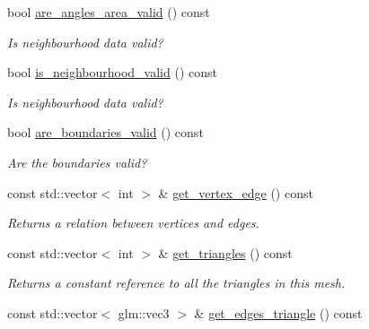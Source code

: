 \begin{DoxyCompactItemize}
\mbox{\label{classgeoproc_1_1TriangleMesh_ad25eb7051e7eac604142d45929f33c19}} 
bool \hyperlink{classgeoproc_1_1TriangleMesh_ad25eb7051e7eac604142d45929f33c19}{are\+\_\+angles\+\_\+area\+\_\+valid} () const
\begin{DoxyCompactList}\small\item\em Is neighbourhood data valid? \end{DoxyCompactList}\item 
\mbox{\label{classgeoproc_1_1TriangleMesh_aa6f95b95709a72a14a15638bfeeed3f9}} 
bool \hyperlink{classgeoproc_1_1TriangleMesh_aa6f95b95709a72a14a15638bfeeed3f9}{is\+\_\+neighbourhood\+\_\+valid} () const
\begin{DoxyCompactList}\small\item\em Is neighbourhood data valid? \end{DoxyCompactList}\item 
\mbox{\label{classgeoproc_1_1TriangleMesh_a409e399857e1a1abc9f23918ff5f5860}} 
bool \hyperlink{classgeoproc_1_1TriangleMesh_a409e399857e1a1abc9f23918ff5f5860}{are\+\_\+boundaries\+\_\+valid} () const
\begin{DoxyCompactList}\small\item\em Are the boundaries valid? \end{DoxyCompactList}\item 
const std\+::vector$<$ int $>$ \& \hyperlink{classgeoproc_1_1TriangleMesh_ae73a760e61250eb2f474b8ab03a1e2ab}{get\+\_\+vertex\+\_\+edge} () const
\begin{DoxyCompactList}\small\item\em Returns a relation between vertices and edges. \end{DoxyCompactList}\item 
const std\+::vector$<$ int $>$ \& \hyperlink{classgeoproc_1_1TriangleMesh_af5093cb9508a1f3193f5b8481bbabef3}{get\+\_\+triangles} () const
\begin{DoxyCompactList}\small\item\em Returns a constant reference to all the triangles in this mesh. \end{DoxyCompactList}\item 
const std\+::vector$<$ glm\+::vec3 $>$ \& \hyperlink{classgeoproc_1_1TriangleMesh_a30ae6e36038a8b38959c233d144b6bff}{get\+\_\+edges\+\_\+triangle} () const

\end{DoxyCompactItemize}
